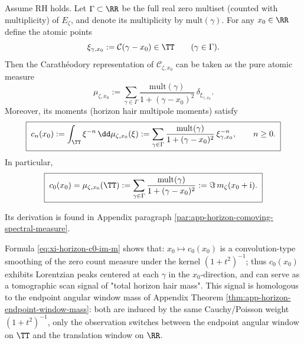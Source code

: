 \begin{theorem}\label{thm:xi-horizon-comoving-spectral-measure}
Assume RH holds.
Let \(\Gamma\subset\RR\) be the full real zero multiset (counted with multiplicity) of \(E_{\zeta}\), and denote its multiplicity by \(\mathrm{mult}(\gamma)\).
For any \(x_0\in\RR\) define the atomic points
\[
  \xi_{\gamma,x_0}:=\mathcal{C}(\gamma-x_0)\in\TT\qquad(\gamma\in\Gamma).
\]
Then the Carath\'eodory representation of \(\mathscr{C}_{\zeta,x_0}\) can be taken as the pure atomic measure
\begin{equation}\label{eq:xi-horizon-mu-comoving}
\boxed{\;
\mu_{\zeta,x_0}
:=
\sum_{\gamma\in\Gamma}\frac{\mathrm{mult}(\gamma)}{1+(\gamma-x_0)^2}\,\delta_{\xi_{\gamma,x_0}}.
\;}
\end{equation}
Moreover, its moments (horizon hair multipole moments) satisfy
\begin{equation}\label{eq:xi-horizon-moment-comoving}
\boxed{\;
c_n(x_0):=\int_{\TT}\xi^{-n}\,\dd\mu_{\zeta,x_0}(\xi)
:=\sum_{\gamma\in\Gamma}\frac{\mathrm{mult}(\gamma)}{1+(\gamma-x_0)^2}\,\xi_{\gamma,x_0}^{-n},
\qquad n\ge 0.
\;}
\end{equation}
In particular,
\begin{equation}\label{eq:xi-horizon-c0-im-m}
\boxed{\;
c_0(x_0)=\mu_{\zeta,x_0}(\TT)
:=\sum_{\gamma\in\Gamma}\frac{\mathrm{mult}(\gamma)}{1+(\gamma-x_0)^2}
:=\Im\,m_{\zeta}(x_0+\mathrm{i}).\;}
\end{equation}
\end{theorem}
\noindent
Its derivation is found in Appendix paragraph \ref{par:app-horizon-comoving-spectral-measure}.

\begin{remark}\label{rem:xi-horizon-lorentz-tomography}
Formula \eqref{eq:xi-horizon-c0-im-m} shows that: \(x_0\mapsto c_0(x_0)\) is a convolution-type smoothing of the zero count measure under the kernel \((1+t^2)^{-1}\);
thus \(c_0(x_0)\) exhibits Lorentzian peaks centered at each \(\gamma\) in the \(x_0\)-direction, and can serve as a tomographic scan signal of "total horizon hair mass".
This signal is homologous to the endpoint angular window mass of Appendix Theorem \ref{thm:app-horizon-endpoint-window-mass}: both are induced by the same Cauchy/Poisson weight \((1+t^2)^{-1}\), only the observation switches between the endpoint angular window on \(\TT\) and the translation window on \(\RR\).
\end{remark}

